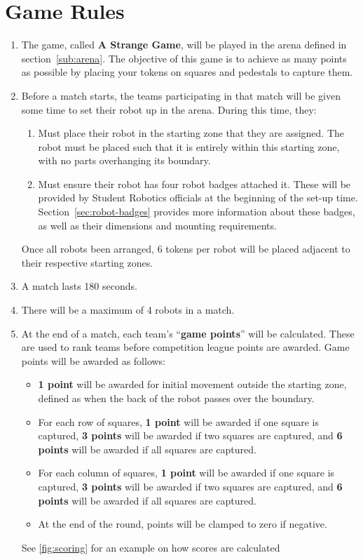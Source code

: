 \section {Game Rules}
\label{game-rules}

\begin{enumerate}
\item The game, called \textbf{A Strange Game}, will be played in the arena defined in section~\ref{sub:arena}.
      The objective of this game is to achieve as many points as possible by placing your tokens on squares and pedestals to capture them.

\item Before a match starts, the teams participating in that match will be given some time to set their robot up in the arena.
      During this time, they:
\begin{enumerate}
  \item Must place their robot in the starting zone that they are assigned.
        The robot must be placed such that it is entirely within this starting zone, with no parts overhanging its boundary.

  \item Must ensure their robot has four robot badges attached it.
        These will be provided by Student Robotics officials at the beginning of the set-up time.
        Section~\ref{sec:robot-badges} provides more information about these badges, as well as their dimensions and mounting requirements.
\end{enumerate}
      Once all robots been arranged, 6 tokens per robot will be placed adjacent to their respective starting zones.

\item A match lasts 180 seconds.

\item There will be a maximum of 4 robots in a match.

\item At the end of a match, each team's ``\textbf{game points}'' will be calculated.
      These are used to rank teams before competition league points are awarded.
      Game points will be awarded as follows:
\begin{itemize}
  \item \textbf{1 point} will be awarded for initial movement outside the starting zone, defined as when the back of the robot passes over the boundary.
  \item For each row of squares, \textbf{1 point} will be awarded if one square is captured, \textbf{3 points} will be awarded if two squares are captured, and \textbf{6 points} will be awarded if all squares are captured.
  \item For each column of squares, \textbf{1 point} will be awarded if one square is captured, \textbf{3 points} will be awarded if two squares are captured, and \textbf{6 points} will be awarded if all squares are captured.
  \item At the end of the round, points will be clamped to zero if negative.
\end{itemize}
      See \ref{fig:scoring} for an example on how scores are calculated


\end{enumerate}

